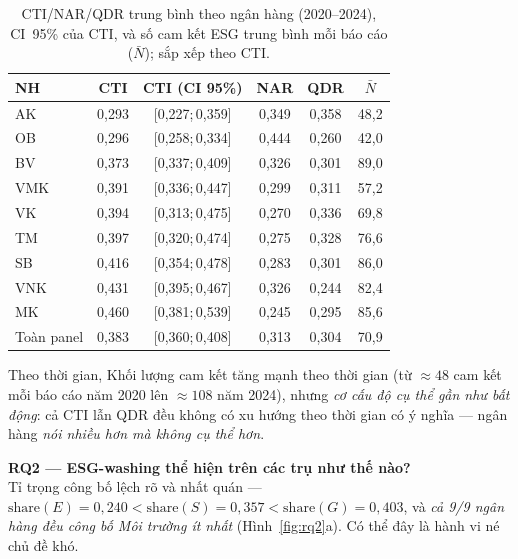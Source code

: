 \documentclass[runningheads]{llncs}
\begin{document}
\begin{table}[H]
\centering
\caption{CTI/NAR/QDR trung bình theo ngân hàng (2020--2024), CI~95\% của CTI, và số cam kết ESG trung bình mỗi báo cáo ($\bar{N}$); sắp xếp theo CTI.}
\label{tab:by_bank}
\begin{tabular}{lccccc}
\toprule
NH & CTI & CTI (CI 95\%) & NAR & QDR & $\bar{N}$ \\
\midrule
AK  & 0{,}293 & [0{,}227;\,0{,}359] & 0{,}349 & 0{,}358 & 48{,}2 \\
OB  & 0{,}296 & [0{,}258;\,0{,}334] & 0{,}444 & 0{,}260 & 42{,}0 \\
BV  & 0{,}373 & [0{,}337;\,0{,}409] & 0{,}326 & 0{,}301 & 89{,}0 \\
VMK & 0{,}391 & [0{,}336;\,0{,}447] & 0{,}299 & 0{,}311 & 57{,}2 \\
VK  & 0{,}394 & [0{,}313;\,0{,}475] & 0{,}270 & 0{,}336 & 69{,}8 \\
TM  & 0{,}397 & [0{,}320;\,0{,}474] & 0{,}275 & 0{,}328 & 76{,}6 \\
SB  & 0{,}416 & [0{,}354;\,0{,}478] & 0{,}283 & 0{,}301 & 86{,}0 \\
VNK & 0{,}431 & [0{,}395;\,0{,}467] & 0{,}326 & 0{,}244 & 82{,}4 \\
MK  & 0{,}460 & [0{,}381;\,0{,}539] & 0{,}245 & 0{,}295 & 85{,}6 \\
\midrule
Toàn panel & 0{,}383 & [0{,}360;\,0{,}408] & 0{,}313 & 0{,}304 & 70{,}9 \\
\bottomrule
\end{tabular}
\end{table}

Theo thời gian, Khối lượng cam kết tăng mạnh theo thời gian (từ $\approx48$ cam kết mỗi báo cáo năm 2020 lên $\approx108$ năm 2024), nhưng \emph{cơ cấu độ cụ thể gần như bất động}: cả CTI lẫn QDR đều không có xu hướng theo thời gian có ý nghĩa --- ngân hàng \emph{nói nhiều hơn mà không cụ thể hơn}.

\noindent\textbf{RQ2 --- ESG-washing thể hiện trên các trụ như thế nào?}\\
Tỉ trọng công bố lệch rõ và nhất quán --- $\mathrm{share}(E)=0{,}240 < \mathrm{share}(S)=0{,}357 < \mathrm{share}(G)=0{,}403$, và \emph{cả 9/9 ngân hàng đều công bố Môi trường ít nhất} (Hình~\ref{fig:rq2}a). Có thể đây là hành vi né chủ đề khó.
\end{document}
